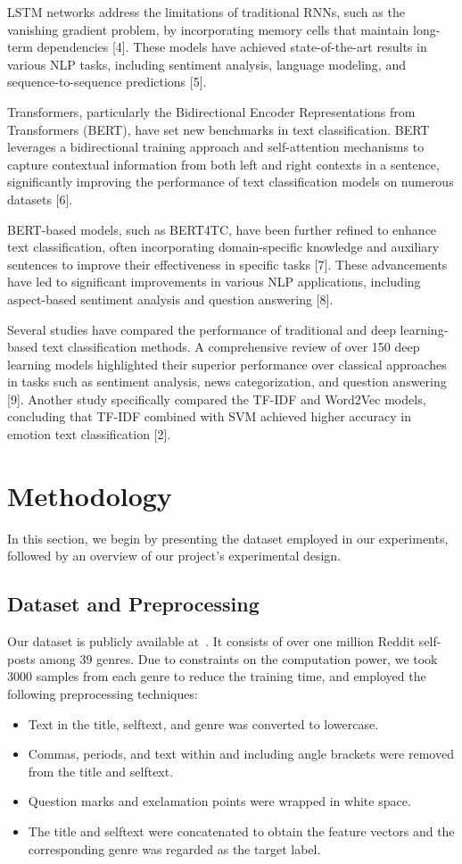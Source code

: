 \documentclass[conference]{IEEEtran}
\begin{document}
LSTM networks address the limitations of traditional RNNs, such as the vanishing gradient problem, by incorporating memory cells that maintain long-term dependencies [4]. These models have achieved state-of-the-art results in various NLP tasks, including sentiment analysis, language modeling, and sequence-to-sequence predictions [5].

Transformers, particularly the Bidirectional Encoder Representations from Transformers (BERT), have set new benchmarks in text classification. BERT leverages a bidirectional training approach and self-attention mechanisms to capture contextual information from both left and right contexts in a sentence, significantly improving the performance of text classification models on numerous datasets [6].

BERT-based models, such as BERT4TC, have been further refined to enhance text classification, often incorporating domain-specific knowledge and auxiliary sentences to improve their effectiveness in specific tasks [7]. These advancements have led to significant improvements in various NLP applications, including aspect-based sentiment analysis and question answering [8].

Several studies have compared the performance of traditional and deep learning-based text classification methods. A comprehensive review of over 150 deep learning models highlighted their superior performance over classical approaches in tasks such as sentiment analysis, news categorization, and question answering [9]. Another study specifically compared the TF-IDF and Word2Vec models, concluding that TF-IDF combined with SVM achieved higher accuracy in emotion text classification [2].

\section{Methodology}
In this section, we begin by presenting the dataset employed in our experiments, followed by an overview of our project's experimental design.

\subsection{Dataset and Preprocessing}
Our dataset is publicly available at~\cite{dataset}. It consists of over one million Reddit self-posts among 39 genres. Due to constraints on the computation power, we took 3000 samples from each genre to reduce the training time, and employed the following preprocessing techniques:
\begin{itemize}
    \item Text in the title, selftext, and genre was converted to lowercase.
    \item Commas, periods, and text within and including angle brackets were removed from the title and selftext.
    \item Question marks and exclamation points were wrapped in white space.
    \item The title and selftext were concatenated to obtain the feature vectors and the corresponding genre was regarded as the target label.
\end{itemize}
\end{document}

